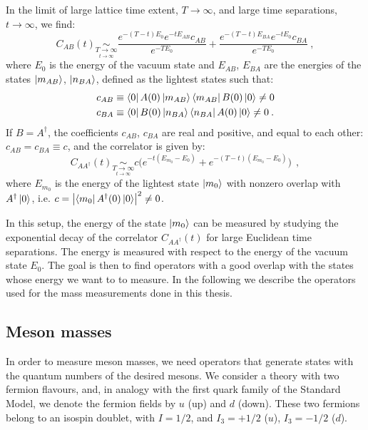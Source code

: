 In the limit of large lattice time extent, $T \to \infty$, and large time separations, $t \to \infty$, we find:
\begin{equation}
C_{AB}(t) \underset{\underset{t \to \infty}{T \to \infty}}{\sim}  \frac{e^{-(T-t)E_0} e^{-tE_{AB}}c_{AB}}{e^{-TE_0}} +
\frac{e^{-(T-t)E_{BA}} e^{-tE_0} c_{BA}}{e^{-TE_0}} \: ,
\end{equation}
%
where $E_0$ is the energy of the vacuum state and $E_{AB}$, $E_{BA}$ are the energies of the states $\ket{m_{AB}}$, $\ket{n_{BA}}$, defined as the lightest states such that:
\begin{equation}
\begin{split}
&c_{AB} \equiv \bra{0} A(0) \ket{m_{AB}} \bra{m_{AB}} B(0) \ket{0} \neq 0 \\
&c_{BA} \equiv \bra{0} B(0) \ket{n_{BA}} \bra{n_{BA}} A(0) \ket{0} \neq 0 \: .
\end{split}
\end{equation}
%
If $B=A^{\dagger}$, the coefficients $c_{AB}$, $c_{BA}$ are real and positive, and equal to each other: $c_{AB} = c_{BA} \equiv c$, and the correlator is given by: 
\begin{equation}
C_{AA^{\dagger}}(t) \underset{\underset{t \to \infty}{T \to \infty}}{\sim} c \biggl( e^{-t(E_{m_0} - E_0)} + e^{-(T-t)(E_{m_0}-E_0)} \biggr)\ \: ,
\label{corr_lowest_energy}
\end{equation}
%
where $E_{m_0}$ is the energy of the lightest state $\ket{m_0}$ with nonzero overlap with $A^{\dagger} \ket{0}$, i.e. $c = \abs{\bra{m_0} A^{\dagger}(0) \ket{0}}^2 \neq 0$.

In this setup, the energy of the state $\ket{m_0}$ can be measured by studying the exponential decay of the correlator $C_{AA^{\dagger}}(t)$ for large Euclidean time separations. The energy is measured with respect to the energy of the vacuum state $E_0$. The goal is then to find operators with a good overlap with the states whose energy we want to to measure. In the following we describe the operators used for the mass measurements done in this thesis.
 

\subsection{Meson masses}
\label{meson_masses}

In order to measure meson masses, we need operators that generate states with the quantum numbers of the desired mesons. We consider a theory with two fermion flavours, and, in analogy with the first quark family of the Standard Model, we denote the fermion fields by $u$ (up) and $d$ (down). These two fermions belong to an isospin doublet, with $I = 1/2$, and $I_3 = +1/2$ ($u$), $I_3 = -1/2$ ($d$).

